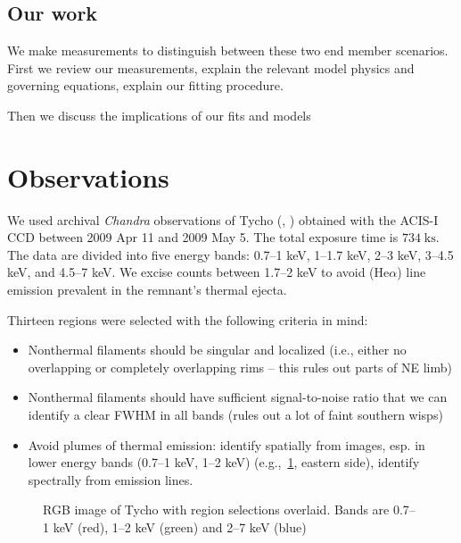 \documentclass[manuscript]{aastex}  %
\newcommand{\mt}{\mathrm}
\newcommand{\unit}[1]{\;\mt{#1}}  %
\begin{document}
\subsection{Our work}

We make measurements to distinguish between these two end member scenarios.
 First we review our measurements,
explain the relevant model physics and governing equations,
explain our fitting procedure.

Then we discuss the implications of our fits and models

\section{Observations}



We used archival \textit{Chandra} observations of Tycho
(,
)
obtained with the ACIS-I CCD between 2009 Apr 11 and 2009 May 5.
The total exposure time is $734 \unit{ks}$.
The data are divided into five energy bands:
0.7--1 keV, 1--1.7 keV, 2--3 keV, 3--4.5 keV, and 4.5--7 keV.
We excise counts between 1.7--2 keV to avoid  (He$\alpha$) line
emission prevalent in the remnant's thermal ejecta.

Thirteen regions were selected with the following criteria in mind:
\begin{itemize}
    \item Nonthermal filaments should be singular and localized (i.e., either
        no overlapping or completely overlapping rims -- this rules out parts
        of NE limb)
    \item Nonthermal filaments should have sufficient signal-to-noise ratio
        that we can identify a clear FWHM in all bands (rules out a lot of
        faint southern wisps)
    \item Avoid plumes of thermal emission: identify spatially from images,
        esp. in lower energy bands (0.7--1 keV, 1--2 keV)
        (e.g.,~\ref{fig:snr}, eastern side), identify spectrally from emission
        lines.
\end{itemize}

\begin{figure}
    \caption{RGB image of Tycho with region selections overlaid.  Bands are
    0.7--1 keV (red), 1--2 keV (green) and 2--7 keV (blue)}
    \label{fig:snr}
\end{figure}
\end{document}
